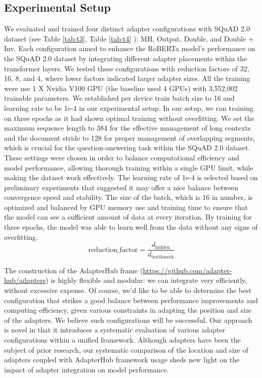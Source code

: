 \documentclass[conference]{IEEEtran}
\begin{document}
\subsection{Experimental Setup}


We evaluated and trained four distinct adapter configurations with SQuAD 2.0 dataset (see Table \ref{tab:t3}, Table \ref{tab:t4} ): MH, Output, Double, and Double + Inv. Each configuration aimed to enhance the RoBERTa model's performance on the SQuAD 2.0 dataset by integrating different adapter placements within the transformer layers. We tested these configurations with reduction factors \cite{b13} of 32, 16, 8, and 4, where lower factors indicated larger adapter sizes. All the training were use 1 X Nvidia V100 GPU (the baseline used 4 GPUs) with 3,552,002 trainable parameters. 
We established per device train batch size to 16 and learning rate to be 1e-4 in our experimental setup. In our setup, we run training on three epochs as it had shown optimal training without overfitting. We set the maximum sequence length to 384 for the effective management of long contexts and the document stride to 128 for proper management of overlapping segments, which is crucial for the question-answering task within the SQuAD 2.0 dataset. These settings were chosen in order to balance computational efficiency and model performance, allowing thorough training within a single GPU limit, while making the dataset work effectively. The learning rate of 1e-4 is selected based on preliminary experiments that suggested it may offer a nice balance between convergence speed and stability. The size of the batch, which is 16 in number, is optimized and balanced by GPU memory use and training time to ensure that the model can see a sufficient amount of data at every iteration. By training for three epochs, the model was able to learn well from the data without any signs of overfitting.
\begin{equation}
    \text{reduction\_factor} = \frac{d_{\text{hidden}}}{d_{\text{bottleneck}}}
    \label{eq:placeholder}
\end{equation}

The construction of the AdapterHub frame (\url{https://github.com/adapter-hub/adapters}) is highly flexible and modular: we can integrate very efficiently, without excessive expense. Of course, we'd like to be able to determine the best configuration that strikes a good balance between performance improvements and computing efficiency, given various constraints in adapting the position and size of the adapters. We believe such configurations will be successful. Our approach is novel in that it introduces a systematic evaluation of various adapter configurations within a unified framework. Although adapters have been the subject of prior research, our systematic comparison of the location and size of adapters coupled with AdapterHub framework usage sheds new light on the impact of adapter integration on model performance. 
\end{document}
